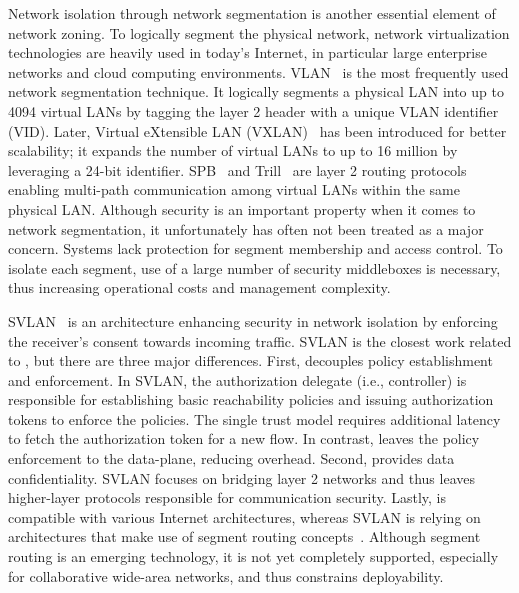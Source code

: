 Network isolation through network segmentation is another essential element of
network zoning. To logically segment the physical network, network
virtualization technologies are heavily used in today's Internet, in particular
large enterprise networks and cloud computing environments.
VLAN~\cite{ieee2018vlan} is the most frequently used network segmentation
technique. It logically segments a physical LAN into up to 4094 virtual LANs by
tagging the layer 2 header with a unique VLAN identifier (VID). Later, Virtual
eXtensible LAN (VXLAN)~\cite{rfc7348} has been introduced for better
scalability; it expands the number of virtual LANs to up to 16 million by
leveraging a 24-bit identifier. SPB~\cite{ieee2012spb} and
Trill~\cite{rfc6325,rfc7176} are layer 2 routing protocols enabling multi-path
communication among virtual LANs within the same physical LAN. Although security
is an important property when it comes to network segmentation, it unfortunately
has often not been treated as a major concern. Systems lack protection for
segment membership and access control. To isolate each segment, use of a large
number of security middleboxes is necessary, thus increasing operational costs
and management complexity.

SVLAN~\cite{kwon2020svlan} is an architecture enhancing security in network
isolation by enforcing the receiver's consent towards incoming traffic. SVLAN is
the closest work related to \name, but there are three major differences. First,
\name decouples policy establishment and enforcement. In SVLAN, the
authorization delegate (i.e., controller) is responsible for establishing basic
reachability policies and issuing authorization tokens to enforce the policies.
The single trust model requires additional latency to fetch the authorization
token for a new flow. In contrast, \name leaves the policy enforcement to the
data-plane, reducing overhead. Second, \name provides data confidentiality.
SVLAN focuses on bridging layer 2 networks and thus leaves higher-layer
protocols responsible for communication security. Lastly, \name is compatible
with various Internet architectures, whereas SVLAN is relying on architectures
that make use of segment
routing concepts~\cite{rfc8402,rfc8660,Perrig2017}. Although segment routing is an
emerging technology, it is not yet completely supported, especially for
collaborative wide-area networks, and thus constrains deployability.

